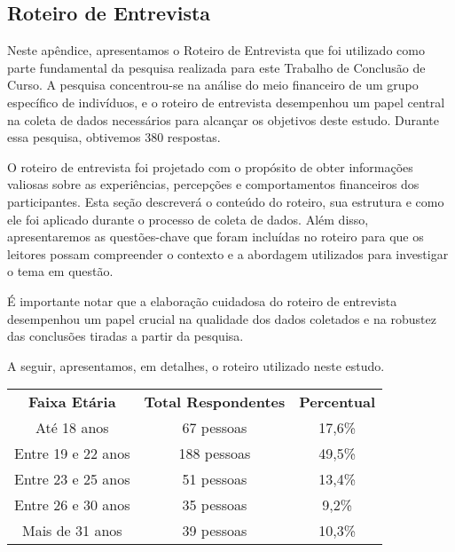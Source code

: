 
\begin{apendicesenv}

\partapendices

\chapter{Roteiro de Entrevista}

Neste apêndice, apresentamos o Roteiro de Entrevista que foi utilizado como parte fundamental da pesquisa realizada para este Trabalho de Conclusão de Curso. A pesquisa concentrou-se na análise do meio financeiro de um grupo específico de indivíduos, e o roteiro de entrevista desempenhou um papel central na coleta de dados necessários para alcançar os objetivos deste estudo. Durante essa pesquisa, obtivemos 380 respostas.

O roteiro de entrevista foi projetado com o propósito de obter informações valiosas sobre as experiências, percepções e comportamentos financeiros dos participantes. Esta seção descreverá o conteúdo do roteiro, sua estrutura e como ele foi aplicado durante o processo de coleta de dados. Além disso, apresentaremos as questões-chave que foram incluídas no roteiro para que os leitores possam compreender o contexto e a abordagem utilizados para investigar o tema em questão.

É importante notar que a elaboração cuidadosa do roteiro de entrevista desempenhou um papel crucial na qualidade dos dados coletados e na robustez das conclusões tiradas a partir da pesquisa. 

A seguir, apresentamos, em detalhes, o roteiro utilizado neste estudo.

\begin{table}[ht]
    \centering
    \setlength{\extrarowheight}{3pt}  %

    \begin{center}
        \begin{minipage}{\textwidth}
            \centering
            \begin{tabular}{|c|c|c|}
                \textbf{Faixa Etária} & \textbf{Total Respondentes} & \textbf{Percentual} \\
                Até 18 anos & 67 pessoas & 17,6\% \\
                Entre 19 e 22 anos & 188 pessoas & 49,5\% \\
                Entre 23 e 25 anos & 51 pessoas & 13,4\% \\
                Entre 26 e 30 anos & 35 pessoas & 9,2\% \\
                Mais de 31 anos & 39 pessoas & 10,3\%
            \end{tabular}
        \end{minipage}
    \end{center}


\end{table}
\end{apendicesenv}
